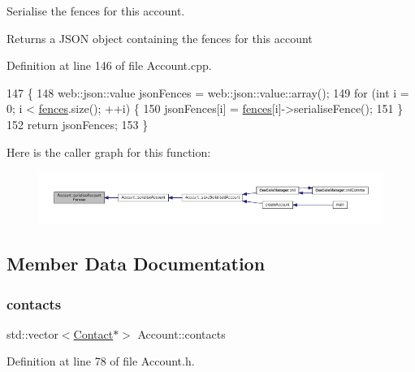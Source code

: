 Serialise the fences for this account.

\begin{DoxyReturn}{Returns}
a J\+S\+ON object containing the fences for this account 
\end{DoxyReturn}


Definition at line 146 of file Account.\+cpp.


\begin{DoxyCode}
147 \{
148     web::json::value jsonFences = web::json::value::array();
149     \textcolor{keywordflow}{for} (\textcolor{keywordtype}{int} i = 0; i < \hyperlink{class_account_ad92a9e8008371f34da06cd416a716fa1}{fences}.size(); ++i) \{
150         jsonFences[i] = \hyperlink{class_account_ad92a9e8008371f34da06cd416a716fa1}{fences}[i]->serialiseFence();
151     \}
152     \textcolor{keywordflow}{return} jsonFences;
153 \}
\end{DoxyCode}
Here is the caller graph for this function\+:
\nopagebreak
\begin{figure}[H]
\begin{center}
\leavevmode
\includegraphics[width=350pt]{db/d22/class_account_a426837a406852a6e6b11eda85828fc58_icgraph}
\end{center}
\end{figure}


\subsection{Member Data Documentation}
\mbox{\label{class_account_aa4f77abd7c44f2a70b0cff8088e3491f}} 
\subsubsection{\texorpdfstring{contacts}{contacts}}
{\footnotesize\ttfamily std\+::vector$<$\hyperlink{class_contact}{Contact}$\ast$$>$ Account\+::contacts\hspace{0.3cm}{\ttfamily [private]}}



Definition at line 78 of file Account.\+h.

\mbox{\label{class_account_ad92a9e8008371f34da06cd416a716fa1}} 
